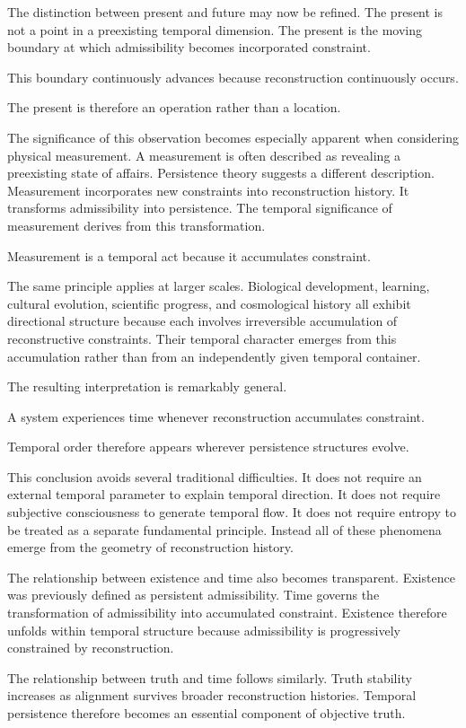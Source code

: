 \documentclass[12pt,oneside]{article}
\theoremstyle{definition}
\begin{document}
The distinction between present and future may now be refined. The present is not a point in a preexisting temporal dimension. The present is the moving boundary at which admissibility becomes incorporated constraint.

This boundary continuously advances because reconstruction continuously occurs.

The present is therefore an operation rather than a location.

The significance of this observation becomes especially apparent when considering physical measurement. A measurement is often described as revealing a preexisting state of affairs. Persistence theory suggests a different description. Measurement incorporates new constraints into reconstruction history. It transforms admissibility into persistence. The temporal significance of measurement derives from this transformation.

Measurement is a temporal act because it accumulates constraint.

The same principle applies at larger scales. Biological development, learning, cultural evolution, scientific progress, and cosmological history all exhibit directional structure because each involves irreversible accumulation of reconstructive constraints. Their temporal character emerges from this accumulation rather than from an independently given temporal container.

The resulting interpretation is remarkably general.

A system experiences time whenever reconstruction accumulates constraint.

Temporal order therefore appears wherever persistence structures evolve.

This conclusion avoids several traditional difficulties. It does not require an external temporal parameter to explain temporal direction. It does not require subjective consciousness to generate temporal flow. It does not require entropy to be treated as a separate fundamental principle. Instead all of these phenomena emerge from the geometry of reconstruction history.

The relationship between existence and time also becomes transparent. Existence was previously defined as persistent admissibility. Time governs the transformation of admissibility into accumulated constraint. Existence therefore unfolds within temporal structure because admissibility is progressively constrained by reconstruction.

The relationship between truth and time follows similarly. Truth stability increases as alignment survives broader reconstruction histories. Temporal persistence therefore becomes an essential component of objective truth.
\end{document}
